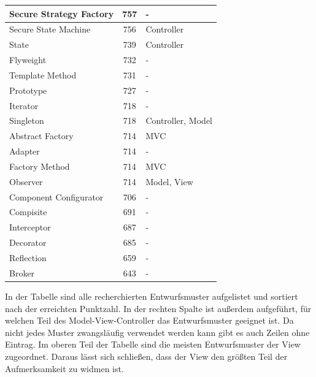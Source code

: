 \begin{table}[hp]
\begin{tabular}{|l|c|l|}
		Secure Strategy Factory        &    757    & -                 \\ \hline
		Secure State Machine           &    756    & Controller        \\ \hline
		State                          &    739    & Controller        \\ \hline
		Flyweight                      &    732    & -                 \\ \hline
		Template Method                &    731    & -                 \\ \hline
		Prototype                      &    727    & -                 \\ \hline
		Iterator                       &    718    & -                 \\ \hline
		Singleton                      &    718    & Controller, Model \\ \hline
		Abstract Factory               &    714    & MVC               \\ \hline
		Adapter                        &    714    & -                 \\ \hline
		Factory Method                 &    714    & MVC               \\ \hline
		Observer                       &    714    & Model, View       \\ \hline
		Component Configurator         &    706    & -                 \\ \hline
		Compisite                      &    691    & -                 \\ \hline
		Interceptor                    &    687    & -                 \\ \hline
		Decorator                      &    685    & -                 \\ \hline
		Reflection                     &    659    & -                 \\ \hline
		Broker                         &    643    & -				   \\ \hline
	\end{tabular}
\end{table}
\newpage

In der Tabelle sind alle recherchierten Entwurfsmuster aufgelistet und sortiert nach der erreichten Punktzahl. In der rechten Spalte ist außerdem aufgeführt, für welchen Teil des Model-View-Controller das Entwurfsmuster geeignet ist. Da nicht jedes Muster zwangsläufig verwendet werden kann gibt es auch Zeilen ohne Eintrag. Im oberen Teil der Tabelle sind die meisten Entwurfsmuster der View zugeordnet. Daraus lässt sich schließen, dass der View den größten Teil der Aufmerksamkeit zu widmen ist.\\

